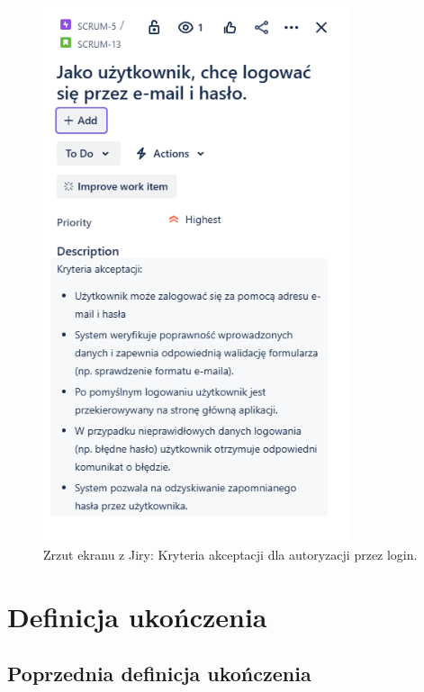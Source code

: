 \documentclass[12pt,a4paper,colorlinks=true,linkcolor=NavyBlue,citecolor=red,urlcolor=NavyBlue]{book}
\begin{document}
\begin{figure}[h!]
\centering
\includegraphics[width=0.8\textwidth]{kryteria_login.png}
\caption{Zrzut ekranu z Jiry: Kryteria akceptacji dla autoryzacji przez login.}
\end{figure}

\newpage
\thispagestyle{empty}
\null
\newpage

\chapter{Definicja ukończenia}

\section{Poprzednia definicja ukończenia}
\end{document}

